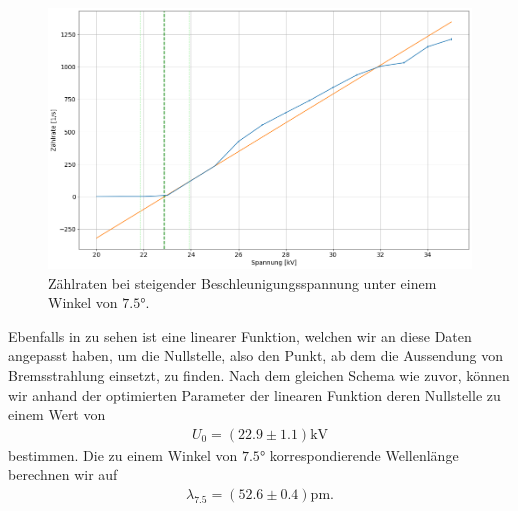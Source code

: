\begin{figure}[H]
  \centering
  \includegraphics[width=.9\textwidth]{files/plots/lif_ang75_volt_fit.png}
  \caption{Zählraten bei steigender Beschleunigungsspannung unter einem Winkel von $7.5\si{\degree}$.}
  \label{fig:lif_ang75_volt_fit}
\end{figure}

Ebenfalls in  zu sehen ist eine linearer Funktion, welchen wir an diese Daten angepasst haben, um die Nullstelle, also den Punkt, ab dem die Aussendung von Bremsstrahlung einsetzt, zu finden. Nach dem gleichen Schema wie zuvor, können wir anhand der optimierten Parameter der linearen Funktion deren Nullstelle zu einem Wert von
\begin{align}
  U_0 = (22.9 \pm 1.1)\si{\kilo\volt}
\end{align}
bestimmen. Die zu einem Winkel von $7.5\si{\degree}$ korrespondierende Wellenlänge berechnen wir auf
\begin{align}
  \lambda_{7.5} = (52.6 \pm 0.4)\si{\pico\meter}.
\end{align}